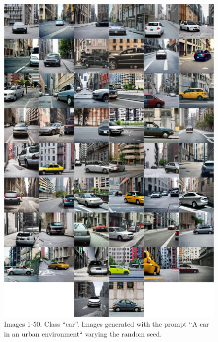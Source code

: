 \begin{figure}
    \centering
    \includegraphics[width=1\columnwidth]{img/6-appendix/dataset_example_car.pdf}
    \caption[Dataset images 1-50]{Images 1-50. Class ``car''. Images generated with the prompt ``A car in an urban environment`` varying the random seed.}
    \label{fig:dataset-car}
\end{figure}


